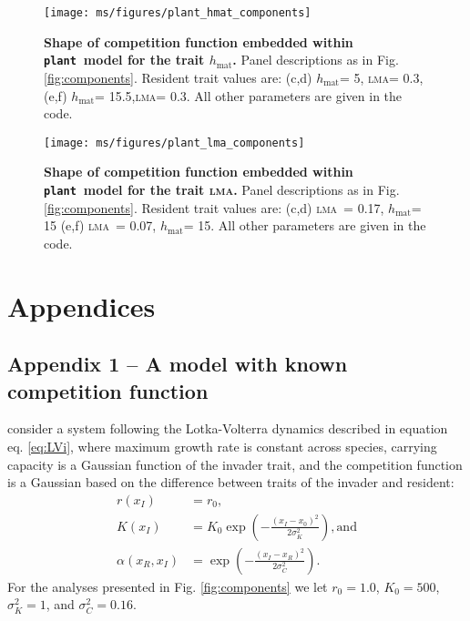 \documentclass[a4paper,11pt]{article}
\newcommand{\plant}{{\tt plant}}
\newcommand{\hmat}{\ensuremath{h_{\text{mat}}}}
\newcommand{\lma}{\textsc{lma}}
\begin{document}
\clearpage

\begin{figure}[ht]
 \centering
 \texttt{[image: ms/figures/plant\_hmat\_components]}
 \caption{{\bf Shape of competition function embedded within \plant\ model for the trait \hmat.} 
	Panel descriptions as in Fig. \ref{fig:components}. Resident trait values are: (c,d) \hmat = 5, \lma = 0.3, (e,f) \hmat = 15.5,\lma = 0.3. All other parameters are given in the code.}
 \label{fig:plant_hmat}
\end{figure}

\clearpage

\begin{figure}[ht]
  \centering
  \texttt{[image: ms/figures/plant\_lma\_components]}
  \caption{{\bf Shape of competition function embedded within \plant\ model for the trait \lma.} 
  Panel descriptions as in Fig. \ref{fig:components}. Resident trait values are: (c,d) \lma\ = 0.17, \hmat = 15 (e,f) \lma\ = 0.07, \hmat = 15. All other parameters are given in the code.}
  \label{fig:plant_lma}
\end{figure}

\clearpage




\section{Appendices}

\subsection{Appendix 1 -- A model with known competition function}\label{sec:DD99}

\citet{Dieckmann-1999} consider a system following the Lotka-Volterra dynamics described in equation eq. \ref{eq:LVi}, where maximum growth rate is constant across species, carrying capacity is a Gaussian function of the invader trait, and the competition function is a Gaussian based on the difference between traits of the invader and resident:
\begin{subequations}
\begin{align}
\label{eq:DD}
r(x_I) &= r_0, \\
K(x_I) &= K_0 \exp\left(-\frac{\left(x_I-x_0\right)^2}{2\sigma^2_K}\right), \textrm{and}\\
\alpha(x_R, x_I) &= \exp\left(-\frac{\left(x_I-x_R\right)^2}{2\sigma^2_C}\right).
\end{align}
\end{subequations}
For the analyses presented in Fig. \ref{fig:components} we let $r_0=1.0$, $K_0=500$, $\sigma^2_K=1$, and $\sigma^2_C=0.16$.
\end{document}
